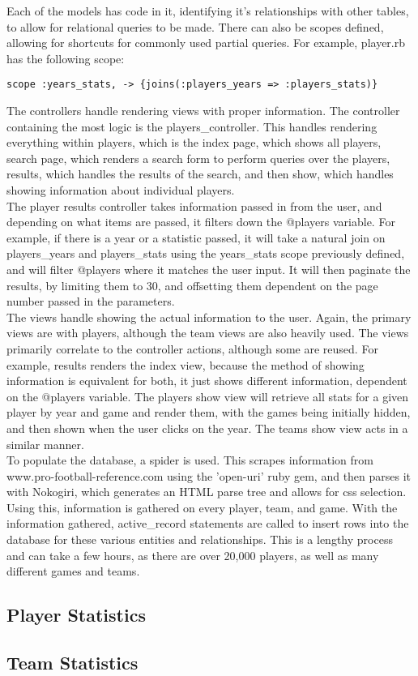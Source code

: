 \documentclass[12pt,letterpaper]{article}
\begin{document}
Each of the models has code in it, identifying it's relationships with
other tables, to allow for relational queries to be made. There can also
be scopes defined, allowing for shortcuts for commonly used partial queries.
For example, player.rb has the following scope: \begin{verbatim}
scope :years_stats, -> {joins(:players_years => :players_stats)}\end{verbatim}

The controllers handle rendering views with proper information.
The controller containing the most logic is the players\_controller. This
handles rendering everything within players, which is the index page, which
shows all players, search page, which renders a search form to perform queries
over the players, results, which handles the results of the search, and then show, which handles showing information about individual players.\\

The player results controller takes information passed in from the user,
and depending on what items are passed, it filters down the @players variable.
For example, if there is a year or a statistic passed, it will take a natural
join on players\_years and players\_stats using the years\_stats scope previously defined, and will filter @players where it matches the user input.
It will then paginate the results, by limiting them to 30, and offsetting them
dependent on the page number passed in the parameters. \\

The views handle showing the actual information to the user. Again, the primary
views are with players, although the team views are also heavily used. The views
primarily correlate to the controller actions, although some are reused. For
example, results renders the index view, because the method of showing information is equivalent for both, it just shows different information, dependent on the @players variable.
The players show view will retrieve all stats for a given player by year and game
and render them, with the games being initially hidden, and then shown when the user
clicks on the year. The teams show view acts in a similar manner.\\

To populate the database, a spider is used. This scrapes information from
www.pro-football-reference.com using the 'open-uri' ruby gem, and then parses
it with Nokogiri, which generates an HTML parse tree and allows for css selection.
Using this, information is gathered on every player, team, and game. With the
information gathered, active\_record statements are called to insert rows into
the database for these various entities and relationships. This is a lengthy
process and can take a few hours, as there are over 20,000 players, as well
as many different games and teams.



\clearpage\null
\subsection{Player Statistics}

\clearpage\null
\subsection{Team Statistics}


\end{document}
